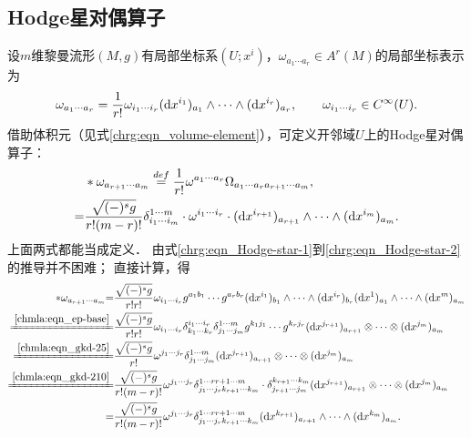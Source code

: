 \subsection{Hodge星对偶算子}\label{chrg:sec_Hodge}
设$m$维黎曼流形$(M,g)$有局部坐标系$(U;x^i)$，$\omega_{a_1 \cdots a_r}\in A^r(M)$的局部坐标表示为
\begin{equation}
    \omega_{a_1 \cdots a_r}= \frac{1}{r!}\omega_{i_1\cdots i_r} ({\rm d}x^{i_1})_{a_1} \wedge \cdots
      \wedge({\rm d}x^{i_r})_{a_r}, \qquad \omega_{i_1\cdots i_r} \in C^\infty(U) .
\end{equation}
借助体积元（见式\eqref{chrg:eqn_volume-element}），可定义开邻域$U$上的Hodge星对偶算子：
\begin{subequations}\label{chrg:eqn_Hodge-star}
\begin{align}
    &*\omega _{ a_{r+1}  \cdots a_m} \overset{def}{=} 
    \frac{1}{r!} \omega^{a_1 \cdots a_r} \Omega_{a_1 \cdots a_r a_{r+1} \cdots a_m},
      \label{chrg:eqn_Hodge-star-1} \\
    =& \frac{\sqrt{(-)^s g}}{r! (m-r)!} \delta_{i_{1} \cdots i_m}^{1 \cdots m}
      \cdot \omega^{i_1\cdots i_r}\cdot   ({\rm d}x^{i_{r+1}})_{a_{r+1}} \wedge
     \cdots \wedge({\rm d}x^{i_m})_{a_m} . \label{chrg:eqn_Hodge-star-2}
\end{align}
\end{subequations}
上面两式都能当成定义．
由式\eqref{chrg:eqn_Hodge-star-1}到\eqref{chrg:eqn_Hodge-star-2}的推导并不困难；
直接计算，得
\setlength{\mathindent}{0em}
\begin{align*}
    *\omega _{a_{r+1} \cdots a_m} {=}  &
    \frac{\sqrt{(-)^s g}}{r! r!} \omega_{i_1\cdots i_r} g^{a_1 b_1}\cdots g^{a_r b_r}
    ({\rm d}x^{i_1})_{b_1} \wedge \cdots \wedge({\rm d}x^{i_r})_{b_r}
    ({\rm d}x^1)_{a_1} \wedge \cdots \wedge({\rm d}x^m)_{a_m} \\
    \xlongequal{\ref{chmla:eqn_ep-base}}& \frac{\sqrt{(-)^s g}}{r! r!} \omega_{i_1\cdots i_r}
    \delta^{i_1 \cdots i_r}_{k_1 \cdots k_r}  \delta_{j_1 \cdots j_m}^{1 \cdots m}
     g^{k_1 j_1}\cdots g^{k_r j_r}
     ({\rm d}x^{j_{r+1}})_{a_{r+1}} \otimes \cdots \otimes ({\rm d}x^{j_m})_{a_m}  \\
     \xlongequal{\ref{chmla:eqn_gkd-25}}& \frac{\sqrt{(-)^s g}}{r!} \omega^{j_1\cdots j_r}
      \delta_{j_1 \cdots j_m}^{1 \cdots m}
     ({\rm d}x^{j_{r+1}})_{a_{r+1}} \otimes \cdots \otimes ({\rm d}x^{j_m})_{a_m}  \\
     \xlongequal{\ref{chmla:eqn_gkd-210}}&
     \frac{\sqrt{(-)^s g}}{r! (m-r)!} \omega^{j_1\cdots j_r}
     \delta_{j_1 \cdots j_r k_{r+1}\cdots k_m}^{1 \cdots r {r+1}\cdots m}
     \cdot \delta^{k_{r+1} \cdots k_m}_{j_{r+1} \cdots j_m}
     ({\rm d}x^{j_{r+1}})_{a_{r+1}} \otimes \cdots \otimes ({\rm d}x^{j_m})_{a_m}  \\
     =&\frac{\sqrt{(-)^s g}}{r! (m-r)!} \omega^{j_1\cdots j_r}
     \delta_{j_1 \cdots j_r k_{r+1}\cdots k_m}^{1 \cdots r {r+1}\cdots m}
     ({\rm d}x^{k_{r+1}})_{a_{r+1}} \wedge \cdots \wedge ({\rm d}x^{k_m})_{a_m}  .
\end{align*}\setlength{\mathindent}{2em}
